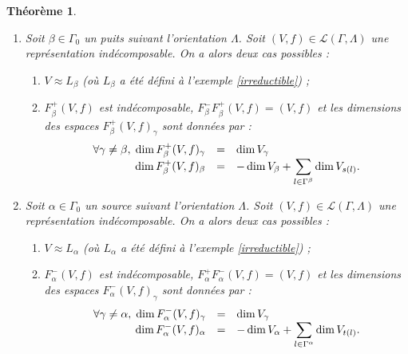 \documentclass[a4paper,10pt]{article}
\newtheorem{thm}{Théorème}[section]
\newcommand{\dps}{\displaystyle}
\begin{document}
\begin{thm}
	\label{thm1}
	\begin{enumerate}
		Soit $(\Gamma,\Lambda)$ un carquois.
	\item Soit $\beta\in\Gamma_0 $ un puits suivant l'orientation $\Lambda$. Soit $(V,f)\in\mathscr L(\Gamma,\Lambda)$ une représentation indécomposable. On a alors deux cas possibles :
			\begin{enumerate}
				\item $V\approx L_\beta$ (où $L_\beta$ a été défini à l'exemple \ref{irreductible}) ;
				\item $F_\beta^+(V,f)$ est indécomposable, $F_\beta^-F_\beta^+(V,f)=(V,f)$ et les dimensions des espaces $F_\beta^+(V,f)_\gamma$ sont données par :
					\[
\begin{array}{>{\dps}r>{\dps}l>{\dps}l}
	\forall\gamma\neq\beta,\;\dim F_\beta^+(V,f)_\gamma&=& \dim V_\gamma\\
	\dim F_\beta^+(V,f)_\beta&=& -\dim V_\beta+\sum_{l\in\Gamma^{\beta}}\dim V_{s(l)}.
\end{array}
					\]
			\end{enumerate}
		\item Soit $\alpha\in\Gamma_0 $ un source suivant l'orientation $\Lambda$. Soit $(V,f)\in\mathscr L(\Gamma,\Lambda)$ une représentation indécomposable. On a alors deux cas possibles :
			\begin{enumerate}
				\item $V\approx L_\alpha$ (où $L_\alpha$ a été défini à l'exemple \ref{irreductible}) ;
				\item $F_\alpha^-(V,f)$ est indécomposable, $F_\alpha^+F_\alpha^-(V,f)=(V,f)$ et les dimensions des espaces $F_\alpha^-(V,f)_\gamma$ sont données par :
					\[
\begin{array}{>{\dps}r>{\dps}l>{\dps}l}
	\forall\gamma\neq\alpha,\;\dim F_\alpha^-(V,f)_\gamma&=& \dim V_\gamma\\
	\dim F_\alpha^-(V,f)_\alpha&=& -\dim V_\alpha+\sum_{l\in\Gamma^{\alpha}}\dim V_{t(l)}.
\end{array}
					\]
			\end{enumerate}
	
	\end{enumerate}
\end{thm}
\end{document}
